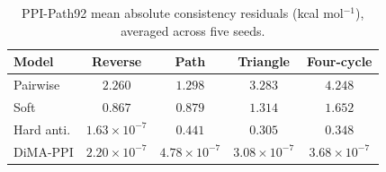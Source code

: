 \begin{table}[t]
\centering
\caption{PPI-Path92 mean absolute consistency residuals (kcal mol$^{-1}$), averaged across five seeds.}
\label{tab:consistency}
\footnotesize
\setlength{\tabcolsep}{3pt}
\begin{tabular}{lcccc}
\toprule Model & Reverse & Path & Triangle & Four-cycle \\
\midrule
Pairwise & $2.260$ & $1.298$ & $3.283$ & $4.248$ \\
Soft & $0.867$ & $0.879$ & $1.314$ & $1.652$ \\
Hard anti. & $1.63\!\times\!10^{-7}$ & $0.441$ & $0.305$ & $0.348$ \\
DiMA-PPI & $2.20\!\times\!10^{-7}$ & $4.78\!\times\!10^{-7}$ & $3.08\!\times\!10^{-7}$ & $3.68\!\times\!10^{-7}$ \\
\bottomrule
\end{tabular}
\end{table}
